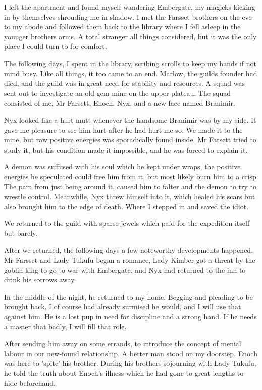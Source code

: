 \documentclass{article}
\begin{document}
I left the apartment and found myself wandering Embergate, my magicks kicking in by themselves shrouding me in shadow. I met the Farsset brothers on the eve to my abode and followed them back to the library where I fell asleep in the younger brothers arms. A total stranger all things considered, but it was the only place I could turn to for comfort.

The following days, I spent in the library, scribing scrolls to keep my hands if not mind busy. Like all things, it too came to an end. Marlow, the guilds founder had died, and the guild was in great need for stability and resources. A squad was sent out to investigate an old gem mine on the upper plateau. The squad consisted of me, Mr Farsett, Enoch, Nyx, and a new face named Branimir.

Nyx looked like a hurt mutt whenever the handsome Branimir was by my side. It gave me pleasure to see him hurt after he had hurt me so. We made it to the mine, but raw positive energies was sporadically found inside. Mr Farsett tried to study it, but his condition made it impossible, and he was forced to explain it. 

A demon was suffused with his soul which he kept under wraps, the positive energies he speculated could free him from it, but most likely burn him to a crisp. The pain from just being around it, caused him to falter and the demon to try to wrestle control. Meanwhile, Nyx threw himself into it, which healed his scars but also brought him to the edge of death. Where I stepped in and saved the idiot.

We returned to the guild with sparse jewels which paid for the expedition itself but barely.

After we returned, the following days a few noteworthy developments happened. Mr Farsset and Lady Tukufu began a romance, Lady Kimber got a threat by the goblin king to go to war with Embergate, and Nyx had returned to the inn to drink his sorrows away. 

In the middle of the night, he returned to my home. Begging and pleading to be brought back. I of course had already surmised he would, and I will use that against him. He is a lost pup in need for discipline and a strong hand. If he needs a master that badly, I will fill that role.

After sending him away on some errands, to introduce the concept of menial labour in our new-found relationship. A better man stood on my doorstep. Enoch was here to 'spite' his brother. During his brothers sojourning with Lady Tukufu, he told the truth about Enoch's illness which he had gone to great lengths to hide beforehand.
\end{document}

